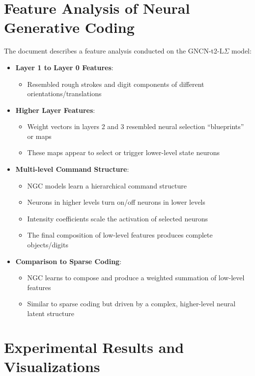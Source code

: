 \documentclass{article}
\begin{document}
\section{Feature Analysis of Neural Generative Coding}

The document describes a feature analysis conducted on the GNCN-t2-L$\Sigma$ model:

\begin{itemize}
  \item \textbf{Layer 1 to Layer 0 Features}:
  \begin{itemize}
    \item Resembled rough strokes and digit components of different orientations/translations
  \end{itemize}

  \item \textbf{Higher Layer Features}:
  \begin{itemize}
    \item Weight vectors in layers 2 and 3 resembled neural selection ``blueprints'' or maps
    \item These maps appear to select or trigger lower-level state neurons
  \end{itemize}

  \item \textbf{Multi-level Command Structure}:
  \begin{itemize}
    \item NGC models learn a hierarchical command structure
    \item Neurons in higher levels turn on/off neurons in lower levels
    \item Intensity coefficients scale the activation of selected neurons
    \item The final composition of low-level features produces complete objects/digits
  \end{itemize}

  \item \textbf{Comparison to Sparse Coding}:
  \begin{itemize}
    \item NGC learns to compose and produce a weighted summation of low-level features
    \item Similar to sparse coding but driven by a complex, higher-level neural latent structure
  \end{itemize}
\end{itemize}

\section{Experimental Results and Visualizations}
\end{document}
